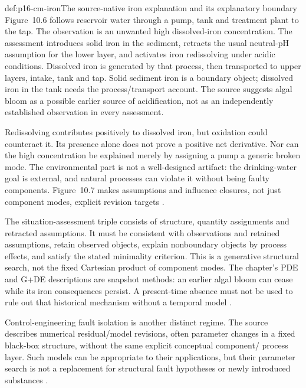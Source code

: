 \begin{hbexample}{def:p16-cm-iron}{The source-native iron explanation and its explanatory boundary}
Figure~10.6 follows reservoir water through a pump, tank and treatment plant
to the tap. The observation is an unwanted high dissolved-iron concentration.
The assessment introduces solid iron in the sediment, retracts the usual
neutral-pH assumption for the lower layer, and activates iron redissolving
under acidic conditions. Dissolved iron is generated by that process, then
transported to upper layers, intake, tank and tap. Solid sediment iron is a
boundary object; dissolved iron in the tank needs the process/transport account.
The source suggests algal bloom as a possible earlier source of acidification,
not as an independently established observation in every assessment.

Redissolving contributes positively to dissolved iron, but oxidation could
counteract it. Its presence alone does not prove a positive net derivative.
Nor can the high concentration be explained merely by assigning a pump a
generic broken mode. The environmental part is not a well-designed artifact:
the drinking-water goal is external, and natural processes can violate it
without being faulty components. Figure~10.7 makes assumptions and influence
closures, not just component modes, explicit revision targets
\cite[pp.~434--437]{Struss2008ModelBasedProblemSolving}.
\end{hbexample}

The situation-assessment triple consists of structure, quantity assignments
and retracted assumptions. It must be consistent with observations and retained
assumptions, retain observed objects, explain nonboundary objects by process
effects, and satisfy the stated minimality criterion. This is a generative
structural search, not the fixed Cartesian product of component modes.
The chapter's PDE and G+DE descriptions are snapshot methods: an earlier
algal bloom can cease while its iron consequences persist. A present-time
absence must not be used to rule out that historical mechanism without a
temporal model \cite[pp.~436--438]{Struss2008ModelBasedProblemSolving}.

Control-engineering fault isolation is another distinct regime. The source
describes numerical residual/model revisions, often parameter changes in a
fixed black-box structure, without the same explicit conceptual component/
process layer. Such models can be appropriate to their applications, but
their parameter search is not a replacement for structural fault hypotheses
or newly introduced substances \cite[sec.~10.4.7]{Struss2008ModelBasedProblemSolving}.

